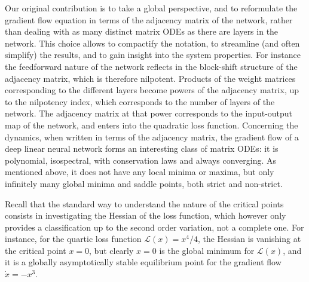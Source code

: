 \documentclass{article}
\newcommand{\1}{\mathds{1}}
\begin{document}
Our original contribution is to take a global perspective, and to reformulate the gradient flow equation in terms of the adjacency matrix of the network, rather than dealing with as many distinct matrix ODEs as there are layers in the network. 
This choice allows to compactify the notation, to streamline (and often simplify) the results, and to gain insight into the system properties.
For instance the feedforward nature of the network reflects in the block-shift structure of the adjacency matrix, which is therefore nilpotent. 
Products of the weight matrices corresponding to the different layers become powers of the adjacency matrix, up to the nilpotency index, which corresponds to the number of layers of the network. The adjacency matrix at that power corresponds to the input-output map of the network, and enters into the quadratic loss function.
Concerning the dynamics, when written in terms of the adjacency matrix, the gradient flow of a deep linear neural network forms an interesting class of matrix ODEs: it is polynomial, isospectral, with conservation laws and always converging.
As mentioned above, it does not have any local minima or maxima, but only infinitely many global minima and saddle points, both strict and non-strict. 

Recall that the standard way to understand the nature of the critical points consists in investigating the Hessian of the loss function, which however only provides a classification up to the second order variation, not a complete one. 
For instance, for the quartic loss function $ \mathcal{L}(x)= x^4/4$, the Hessian is vanishing at the critical point $ x=0$, but clearly $ x=0$ is the global minimum for $ \mathcal{L}(x)$, and it is a globally asymptotically stable equilibrium point for the gradient flow $ \dot x = - x^3 $.
\end{document}
